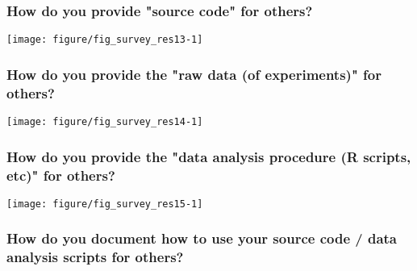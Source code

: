\documentclass{article}\usepackage[]{graphicx}\usepackage[]{color}
\newenvironment{knitrout}{}{}
\begin{document}
\subsubsection{How do you provide "source code" for others?}

\begin{knitrout}
\color{fgcolor}

{\centering \texttt{[image: figure/fig\_survey\_res13-1]} 

}



\end{knitrout}





\subsubsection{How do you provide the "raw data (of experiments)" for others?}

\begin{knitrout}
\color{fgcolor}

{\centering \texttt{[image: figure/fig\_survey\_res14-1]} 

}



\end{knitrout}






\subsubsection{How do you provide the "data analysis procedure (R scripts, etc)" for others?}

\begin{knitrout}
\color{fgcolor}

{\centering \texttt{[image: figure/fig\_survey\_res15-1]} 

}



\end{knitrout}





\subsubsection{How do you document how to use your source code / data analysis scripts for others?}
\end{document}
